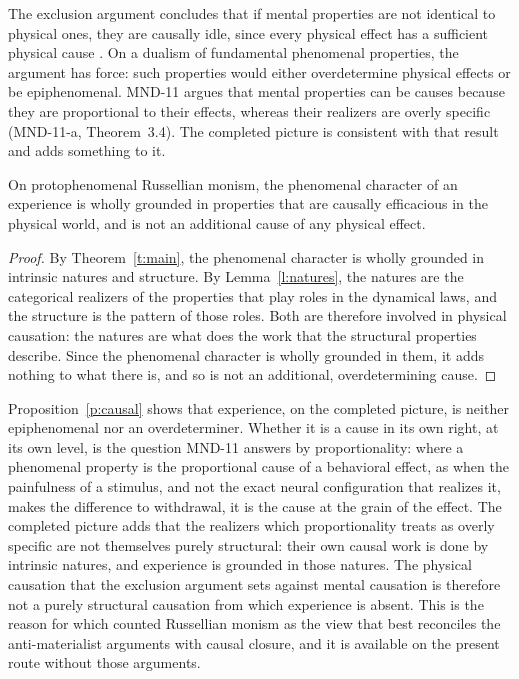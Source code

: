 \documentclass{situationist-preprint}
\begin{document}
The exclusion argument concludes that if mental properties are not identical to physical ones, they are causally idle, since every physical effect has a sufficient physical cause \citep{Kim2005}. On a dualism of fundamental phenomenal properties, the argument has force: such properties would either overdetermine physical effects or be epiphenomenal. MND-11 argues that mental properties can be causes because they are proportional to their effects, whereas their realizers are overly specific (MND-11-a, Theorem~3.4). The completed picture is consistent with that result and adds something to it.

\begin{proposition}\label{p:causal}
On protophenomenal Russellian monism, the phenomenal character of an experience is wholly grounded in properties that are causally efficacious in the physical world, and is not an additional cause of any physical effect.
\end{proposition}

\begin{proof}
By Theorem~\ref{t:main}, the phenomenal character is wholly grounded in intrinsic natures and structure. By Lemma~\ref{l:natures}, the natures are the categorical realizers of the properties that play roles in the dynamical laws, and the structure is the pattern of those roles. Both are therefore involved in physical causation: the natures are what does the work that the structural properties describe. Since the phenomenal character is wholly grounded in them, it adds nothing to what there is, and so is not an additional, overdetermining cause.
\end{proof}

Proposition~\ref{p:causal} shows that experience, on the completed picture, is neither epiphenomenal nor an overdeterminer. Whether it is a cause in its own right, at its own level, is the question MND-11 answers by proportionality: where a phenomenal property is the proportional cause of a behavioral effect, as when the painfulness of a stimulus, and not the exact neural configuration that realizes it, makes the difference to withdrawal, it is the cause at the grain of the effect. The completed picture adds that the realizers which proportionality treats as overly specific are not themselves purely structural: their own causal work is done by intrinsic natures, and experience is grounded in those natures. The physical causation that the exclusion argument sets against mental causation is therefore not a purely structural causation from which experience is absent. This is the reason for which \citet{Chalmers1996} counted Russellian monism as the view that best reconciles the anti-materialist arguments with causal closure, and it is available on the present route without those arguments.
\end{document}
